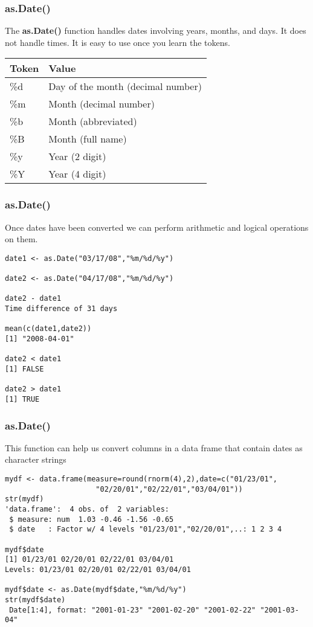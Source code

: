 \documentclass{beamer}
\begin{document}
\begin{frame}[fragile]
\frametitle{as.Date()}
The \textbf{as.Date()} function handles dates involving years, months, and days. It does not handle times. It is easy to use once you learn the tokens. 
\newline
\begin{center}
\begin{tabular}{| l | l | }
  \hline         
  Token & Value \\ \hline
  \%d & Day of the month (decimal number) \\ \hline
  \%m & Month (decimal number) \\ \hline
  \%b & Month (abbreviated) \\ \hline
  \%B & Month (full name) \\ \hline
  \%y & Year (2 digit) \\ \hline
  \%Y & Year (4 digit) \\ \hline
  \hline  
\end{tabular}
\end{center}
\end{frame}

\begin{frame}[fragile]
\frametitle{as.Date()}
Once dates have been converted we can perform arithmetic and logical operations on them. 
\footnotesize
\begin{verbatim}
date1 <- as.Date("03/17/08","%m/%d/%y")

date2 <- as.Date("04/17/08","%m/%d/%y")

date2 - date1
Time difference of 31 days

mean(c(date1,date2))
[1] "2008-04-01"

date2 < date1
[1] FALSE

date2 > date1
[1] TRUE
\end{verbatim}
\end{frame}


\begin{frame}[fragile]
\frametitle{as.Date()}
This function can help us convert columns in a data frame that contain dates as character strings
\footnotesize
\begin{verbatim}
mydf <- data.frame(measure=round(rnorm(4),2),date=c("01/23/01",
                     "02/20/01","02/22/01","03/04/01"))
str(mydf)
'data.frame':  4 obs. of  2 variables:
 $ measure: num  1.03 -0.46 -1.56 -0.65
 $ date   : Factor w/ 4 levels "01/23/01","02/20/01",..: 1 2 3 4

mydf$date
[1] 01/23/01 02/20/01 02/22/01 03/04/01
Levels: 01/23/01 02/20/01 02/22/01 03/04/01

mydf$date <- as.Date(mydf$date,"%m/%d/%y")
str(mydf$date)
 Date[1:4], format: "2001-01-23" "2001-02-20" "2001-02-22" "2001-03-04"
\end{verbatim}
\end{frame}
\end{document}
